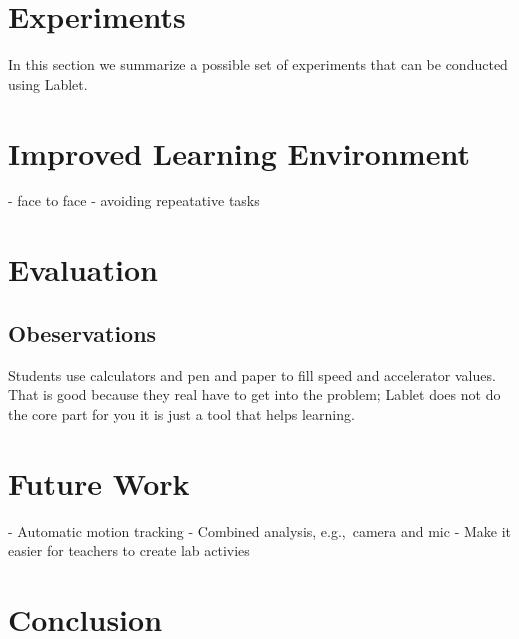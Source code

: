 \documentclass{sigchi}
\newcommand{\eg}{e.g.,\ }
\begin{document}
\section{Experiments}
In this section we summarize a possible set of experiments that can be conducted using Lablet.

\section{Improved Learning Environment}
- face to face 
- avoiding repeatative tasks

\section{Evaluation}

\subsection{Obeservations}
Students use calculators and pen and paper to fill speed and accelerator values.
That is good because they real have to get into the problem; Lablet does not do the core part for you it is just a tool that helps learning.

\section{Future Work}
- Automatic motion tracking
- Combined analysis, \eg camera and mic
- Make it easier for teachers to create lab activies

\section{Conclusion}



\end{document}
